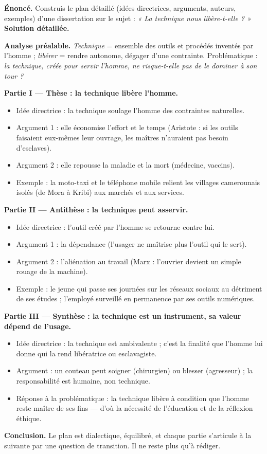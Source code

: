 \documentclass[11pt]{article}
\begin{document}
\begin{exoresolu}
\textbf{Énoncé.} Construis le plan détaillé (idées directrices, arguments, auteurs, exemples) d'une dissertation sur le sujet : \emph{« La technique nous libère-t-elle ? »}
\tcblower
\textbf{Solution détaillée.}

\textbf{Analyse préalable.} \emph{Technique} = ensemble des outils et procédés inventés par l'homme ; \emph{libérer} = rendre autonome, dégager d'une contrainte. Problématique : \emph{la technique, créée pour servir l'homme, ne risque-t-elle pas de le dominer à son tour ?}

\textbf{Partie I — Thèse : la technique libère l'homme.}
\begin{itemize}
\item Idée directrice : la technique soulage l'homme des contraintes naturelles.
\item Argument 1 : elle économise l'effort et le temps (Aristote : si les outils faisaient eux-mêmes leur ouvrage, les maîtres n'auraient pas besoin d'esclaves).
\item Argument 2 : elle repousse la maladie et la mort (médecine, vaccins).
\item Exemple : la moto-taxi et le téléphone mobile relient les villages camerounais isolés (de Mora à Kribi) aux marchés et aux services.
\end{itemize}

\textbf{Partie II — Antithèse : la technique peut asservir.}
\begin{itemize}
\item Idée directrice : l'outil créé par l'homme se retourne contre lui.
\item Argument 1 : la dépendance (l'usager ne maîtrise plus l'outil qui le sert).
\item Argument 2 : l'aliénation au travail (Marx : l'ouvrier devient un simple rouage de la machine).
\item Exemple : le jeune qui passe ses journées sur les réseaux sociaux au détriment de ses études ; l'employé surveillé en permanence par ses outils numériques.
\end{itemize}

\textbf{Partie III — Synthèse : la technique est un instrument, sa valeur dépend de l'usage.}
\begin{itemize}
\item Idée directrice : la technique est ambivalente ; c'est la finalité que l'homme lui donne qui la rend libératrice ou esclavagiste.
\item Argument : un couteau peut soigner (chirurgien) ou blesser (agresseur) ; la responsabilité est humaine, non technique.
\item Réponse à la problématique : la technique libère à condition que l'homme reste maître de ses fins — d'où la nécessité de l'éducation et de la réflexion éthique.
\end{itemize}

\textbf{Conclusion.} Le plan est dialectique, équilibré, et chaque partie s'articule à la suivante par une question de transition. Il ne reste plus qu'à rédiger.
\end{exoresolu}
\end{document}
